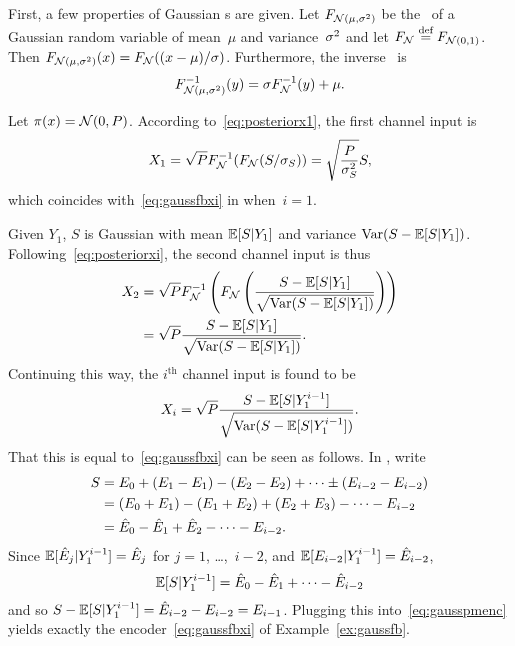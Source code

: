 \begin{example}
  \label{ex:gaussfbpost}
  First, a few properties of Gaussian \cdf s are given. Let $F_{{\mathcal{N}}(\mu, {\sigma^2})}$
  be the \cdf\ of a Gaussian random variable of mean~$\mu$ and variance~${\sigma^2}$
  and let $F_{\mathcal{N}} \stackrel{\text{def}}{=} F_{{\mathcal{N}}(0,1)}$. Then $F_{{\mathcal{N}}(\mu,{\sigma^2})}(x) =
  F_{\mathcal{N}}((x-\mu)/\sigma)$. Furthermore, the inverse \cdf\ is 
  \begin{equation*}
    F_{{\mathcal{N}}(\mu,{\sigma^2})}^{-1}(y) = \sigma F_{\mathcal{N}}^{-1}(y) + \mu.
  \end{equation*}

  Let $\pi(x) = {\mathcal{N}}(0,P)$. According to~\eqref{eq:posteriorx1}, the first channel
  input is
  \begin{equation*}
    X_1 = \sqrt{P} F_{{\mathcal{N}}}^{-1}(F_{{\mathcal{N}}}(S/\sigma_S)) = \sqrt{\frac{P}{{\sigma_S^2}}} S,
  \end{equation*}
  which coincides with~\eqref{eq:gaussfbxi} in  when~$i=1$.

  Given $Y_1$, $S$ is Gaussian with mean $\mathbb{E}[S|Y_1]$ and variance $\operatorname{Var}(S -
  \mathbb{E}[S|Y_1])$. Following~\eqref{eq:posteriorxi}, the second channel input is
  thus
  \begin{align*}
    X_2 &= \sqrt P F_{{\mathcal{N}}}^{-1} \left( F_{{\mathcal{N}}} \left( \frac{S - \mathbb{E}[S|Y_1]}
    {\sqrt{\operatorname{Var}(S-\mathbb{E}[S|Y_1])}} \right) \right) \\
    &= \sqrt{P} \frac{S - \mathbb{E}[S|Y_1]}{\sqrt{\operatorname{Var}(S-\mathbb{E}[S|Y_1])}}.
  \end{align*}
  Continuing this way, the $i^{\text{th}}$ channel input is found to be
  \begin{equation}
    \label{eq:gausspmenc}
    X_i = \sqrt{P} \frac{S - \mathbb{E}[S|Y_1^{i-1}]}{\sqrt{\operatorname{Var}(S-\mathbb{E}[S|Y_1^{i-1}])}}.
  \end{equation}
  That this is equal to~\eqref{eq:gaussfbxi} can be seen as follows. In
  , write
  \begin{align*}
    S &= E_0 + (E_1 - E_1) - (E_2 - E_2) + \dots \pm (E_{i-2} -
    E_{i-2}) \\
    &= (E_0 + E_1) - (E_1 + E_2) + (E_2 + E_3) - \dots - E_{i-2} \\
    &= \hat{E}_0 - \hat{E}_1 + \hat{E}_2 - \dots - E_{i-2}.
  \end{align*}
  Since $\mathbb{E}[\hat{E}_j | Y_1^{i-1}] = \hat{E}_j$ for $j = 1$, \dots,~$i-2$, and
  $\mathbb{E}[E_{i-2}|Y_1^{i-1}] = \hat{E}_{i-2}$, 
  \begin{equation*}
    \mathbb{E}[S|Y_1^{i-1}] = \hat{E}_0 - \hat{E}_1 + \dots  - \hat{E}_{i-2}
  \end{equation*}
  and so $S - \mathbb{E}[S|Y_1^{i-1}] = \hat{E}_{i-2} - E_{i-2} = E_{i-1}$. Plugging this
  into~\eqref{eq:gausspmenc} yields exactly the encoder~\eqref{eq:gaussfbxi} of
  Example~\ref{ex:gaussfb}.
\end{example}

